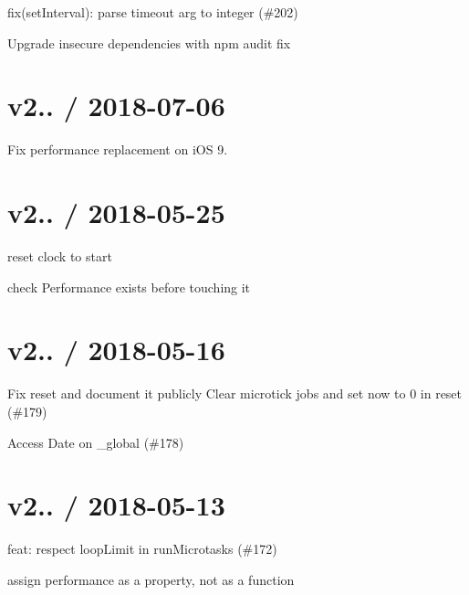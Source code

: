 \begin{DoxyItemize}
\item fix(set\+Interval)\+: parse {\ttfamily timeout} arg to integer (\#202)
\item Upgrade insecure dependencies with npm audit fix
\end{DoxyItemize}

\section*{v2.. / 2018-\/07-\/06 }


\begin{DoxyItemize}
\item Fix performance replacement on i\+OS 9.
\end{DoxyItemize}

\section*{v2.. / 2018-\/05-\/25 }


\begin{DoxyItemize}
\item reset clock to start
\item check Performance exists before touching it
\end{DoxyItemize}

\section*{v2.. / 2018-\/05-\/16 }


\begin{DoxyItemize}
\item Fix {\ttfamily reset} and document it publicly Clear microtick jobs and set now to 0 in reset (\#179)
\item Access Date on {\ttfamily \+\_\+global} (\#178)
\end{DoxyItemize}

\section*{v2.. / 2018-\/05-\/13 }


\begin{DoxyItemize}
\item feat\+: respect loop\+Limit in run\+Microtasks (\#172)
\item assign performance as a property, not as a function
\end{DoxyItemize}

